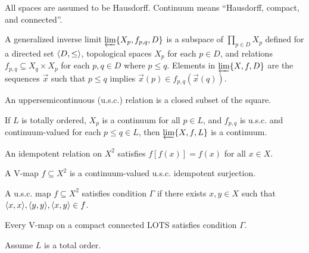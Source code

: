\documentclass[11pt]{article}
\newcommand{\vect}{\vec}
\begin{document}
  All spaces are assumed to be Hausdorff. Continuum means ``Hausdorff, compact,
  and connected''.

  \begin{definition}
    A generalized inverse limit \(\varprojlim \{X_p, f_{p,q}, D\}\) is a
    subspace of \(\prod_{p\in D}X_p\) defined for
    a directed set \(\langle D,\leq\rangle\),
    topological spaces \(X_p\) for each \(p\in D\),
    and relations \(f_{p,q}\subseteq X_q\times X_p\) for each
    \(p,q\in D\) where \(p\leq q\). Elements in  \(\varprojlim \{X, f, D\}\)
    are the sequences \(\vect x\) such that \(p\leq q\) implies
    \(\vect x(p)\in f_{p,q}(\vect x(q))\).
  \end{definition}

  \begin{definition}
    An uppersemicontinuous (u.s.c.) relation is a closed subset of the
    square.
  \end{definition}

  \begin{theorem}
    If \(L\) is totally ordered, \(X_p\) is a continuum for all \(p\in L\),
    and \(f_{p,q}\) is u.s.c. and continuum-valued for each \(p\leq q\in L\),
    then \(\varprojlim\{X,f,L\}\) is a continuum.
  \end{theorem}

  \begin{definition}
    An idempotent relation on \(X^2\) satisfies \(f[f(x)]=f(x)\) for all
    \(x\in X\).
  \end{definition}

  \begin{definition}
    A V-map \(f\subseteq X^2\) is a continuum-valued u.s.c. idempotent
    surjection.
  \end{definition}

  \begin{definition}
    A u.s.c. map \(f\subseteq X^2\)
    satisfies condition \(\Gamma\) if there exists \(x,y\in X\) such that
    \(\langle x,x\rangle,\langle y,y\rangle,\langle x,y\rangle\in f\).
  \end{definition}

  \begin{theorem}
    Every V-map on a compact connected LOTS satisfies condition \(\Gamma\).
  \end{theorem}





\newpage

  Assume \(L\) is a total order.
\end{document}
